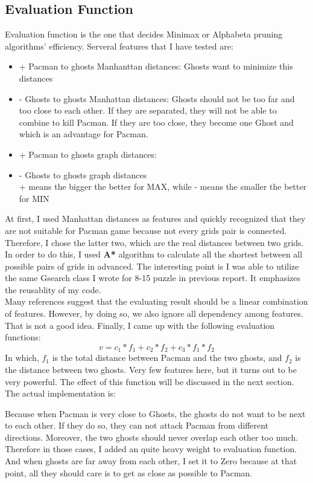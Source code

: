 \documentclass[a4paper, 11pt]{article}
\begin{document}
\subsection{Evaluation Function}
Evaluation function is the one that decides Minimax or Alphabeta pruning algorithms' efficiency. Serveral features that I have tested are:
\begin{itemize}
\item{+} Pacman to ghosts Manhanttan distances: Ghosts want to minimize this distances
\item{-} Ghosts to ghosts Manhattan distances: Ghosts should not be too far and too close to each other. If they are separated, they will not be able to combine to kill Pacman. If they are too close, they become one Ghost and which is an advantage for Pacman.
\item{+} Pacman to ghosts graph distances:
\item{-} Ghosts to ghosts graph distances \\
  + means the bigger the better for MAX, while - means the smaller the better for MIN
\end{itemize}
At first, I used Manhattan distances as features and quickly recognized that they are not suitable for Pacman game because not every grids pair is connected. Therefore, I chose the latter two, which are the real distances between two grids. In order to do this, I used \textbf{A*} algorithm to calculate all the shortest between all possible pairs of grids in advanced. The interesting point is I was able to utilize the same Gsearch class I wrote for 8-15 puzzle in previous report. It emphasizes the reusablity of my code. \\
Many references suggest that the evaluating result should be a linear combination of features. However, by doing so, we also ignore all dependency among features. That is not a good idea. Finally, I came up with the following evaluation functions: 
\[ v = c_1*f_1+c_2*f_2+c_3*f_1*f_2\]
In which, $f_1$ is the total distance between Pacman and the two ghosts, and $f_2$ is the distance between two ghosts. Very few features here, but it turns out to be very powerful. The effect of this function will be discussed in the next section. \\
The actual implementation is:


Because when Pacman is very close to Ghosts, the ghosts do not want to be next to each other. If they do so, they can not attack Pacman from different directions. Moreover, the two ghosts should never overlap each other too much. Therefore in those cases, I added an quite heavy weight to evaluation function. And when ghosts are far away from each other, I set it to Zero because at that point, all they should care is to get as close as possible to Pacman. 
\newpage
\end{document}
